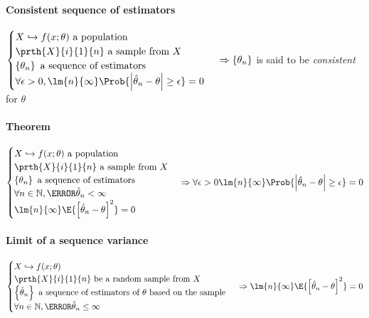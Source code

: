 \paragraph{Consistent sequence of estimators}
$
\begin{cases}
	X\hookrightarrow f(x;\theta)\text{ a population}\\
	\prth{X}{i}{1}{n}\text{ a sample from }X\\
	\left\{\theta_{n}\right\}\text{ a sequence of estimators}\\
	\forall\epsilon>0,\lm{n}{\infty}\Prob{\left|\hat{\theta}_{n}-\theta\right|\geq \epsilon}=0
\end{cases}\\
\Rightarrow
\left\{\theta_{n}\right\}
$ is said to be \emph{consistent} for $\theta$

\paragraph{Theorem}
$
\begin{cases}
	X\hookrightarrow f(x;\theta)\text{ a population}\\
	\prth{X}{i}{1}{n}\text{ a sample from }X\\
	\left\{\theta_{n}\right\}\text{ a sequence of estimators}\\
	\forall n\in\mathbb{N},\V{\hat{\theta}_{n}}<\infty\\
	\lm{n}{\infty}\E{\left[\hat{\theta}_{n}-\theta\right]^{2}}=0
\end{cases}
\Rightarrow
\forall\epsilon >0 \lm{n}{\infty}\Prob{\left|\hat{\theta}_{n}-\theta\right|\geq \epsilon} = 0
$

\paragraph{Limit of a sequence variance}
$
\begin{cases}
	X\hookrightarrow f(x;\theta)\\
	\prth{X}{i}{1}{n}\text{ be a random sample from }X\\
	\left\{\hat{\theta}_{n}\right\}\text{ a sequence of estimators of }\theta\text{ based on the sample}\\
	\forall n\in\mathbb{N},\V{\hat{\theta}_{n}}\leq \infty
\end{cases}\\
\Rightarrow
\lm{n}{\infty}\E{\left[\hat{\theta}_{n}-\theta\right]^{2}}=0
$
